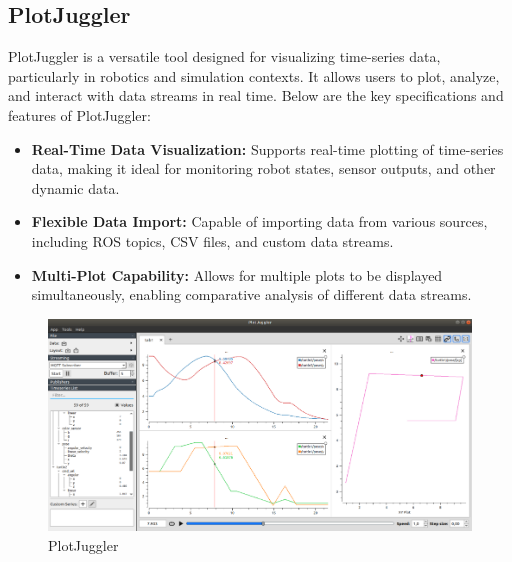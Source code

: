 \subsection{\fontsize{14}{16} PlotJuggler}
{
	\fontsize{12}{14}
	PlotJuggler is a versatile tool designed for visualizing time-series data, particularly in robotics
	and simulation contexts. It allows users to plot, analyze, and interact with data streams in real
	time. Below are the key specifications and features of PlotJuggler:
	\begin{itemize}
		\item \textbf{Real-Time Data Visualization:} Supports real-time plotting of time-series data, making
		it ideal for monitoring robot states, sensor outputs, and other dynamic data.
		\item \textbf{Flexible Data Import:} Capable of importing data from various sources, including ROS
		topics, CSV files, and custom data streams.
		\item \textbf{Multi-Plot Capability:} Allows for multiple plots to be displayed simultaneously,
		enabling comparative analysis of different data streams.
	\end{itemize}
	
	\begin{figure}[H]
		\centering
		\includegraphics{images/Content/plotjug}
		\caption{PlotJuggler \cite{plotjuggler_github}}
		\label{fig:plotjug}
	\end{figure}
}

